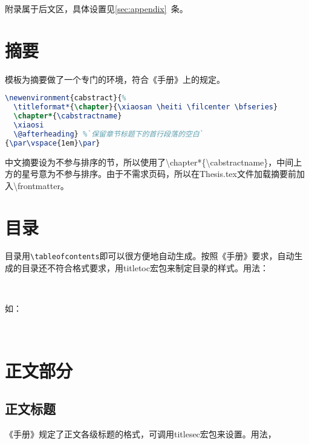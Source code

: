 附录属于后文区，具体设置见\ref{sec:appendix}~条。

\section{摘要}
模板为摘要做了一个专门的环境，符合《手册》上的规定。
\begin{lstlisting}[language=TeX]
\newenvironment{cabstract}{%
  \titleformat*{\chapter}{\xiaosan \heiti \filcenter \bfseries}
  \chapter*{\cabstractname}
  \xiaosi
  \@afterheading} %`保留章节标题下的首行段落的空白`
{\par\vspace{1em}\par}
\end{lstlisting}
中文摘要设为不参与排序的节，所以使用了\textbackslash chapter*\{\textbackslash cabstractname\}，中间上方的星号意为不参与排序。由于不需求页码，所以在Thesis.tex文件加载摘要前加入\textbackslash frontmatter。

\section{目录}
目录用\verb|\tableofcontents|即可以很方便地自动生成。按照《手册》要求，自动生成的目录还不符合格式要求，用titletoc宏包来制定目录的样式。用法：

{\\}

如：

{\\}

\section{正文部分}
\subsection{正文标题}
《手册》规定了正文各级标题的格式，可调用titlesec宏包来设置。用法，


